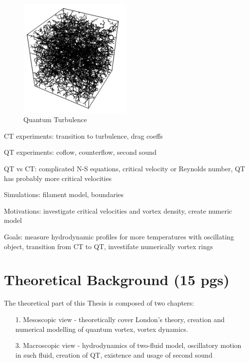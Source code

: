 	\begin{figure}[h]
		\centering
		\includegraphics[width=0.5\textwidth]{graphics/QT-tangle}
		\caption{Quantum Turbulence}
		\label{QT}
	\end{figure}

	CT experiments: transition to turbulence, drag coeffs

	QT experiments: coflow, counterflow, second sound

	QT vs CT: complicated N-S equations, critical velocity or Reynolds number, QT has probably more critical velocities

	Simulations: filament model, boundaries

	Motivations: investigate critical velocities and vortex density, create numeric model

	Goals: measure hydrodynamic profiles for more temperatures with oscillating object, transition from CT to QT, investifate numerically vortex rings

\newpage
\chapter{Theoretical Background (15 pgs)}

The theoretical part of this Thesis is composed of two chapters:

\begin{itemize}
	\item[1.] Mesoscopic view - theoretically cover London's theory, creation and numerical modelling of quantum vortex, vortex dynamics.

	\item[3.] Macroscopic view - hydrodynamics of two-fluid model, oscillatory motion in such fluid, creation of QT, existence and usage of second sound

\end{itemize}

